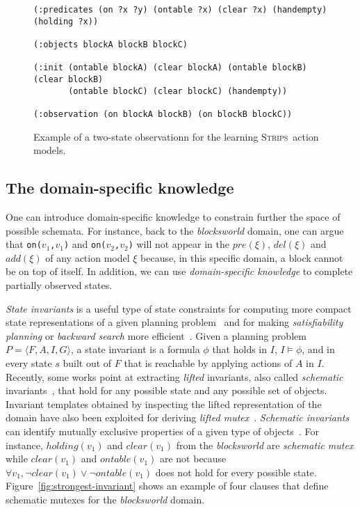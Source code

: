 \documentclass[runningheads]{llncs}
\newcommand{\tup}[1]{{\langle #1 \rangle}}
\newcommand{\strips}{\textsc{Strips}}     %
\begin{document}
\begin{figure}[hbt!]
  \begin{small}
  \begin{verbatim}
(:predicates (on ?x ?y) (ontable ?x) (clear ?x) (handempty) (holding ?x))

(:objects blockA blockB blockC)

(:init (ontable blockA) (clear blockA) (ontable blockB) (clear blockB)
       (ontable blockC) (clear blockC) (handempty))

(:observation (on blockA blockB) (on blockB blockC))
  \end{verbatim}
  \end{small}
	\caption{\small Example of a two-state observationn for the learning \strips\ action models.}
	\label{fig:observation}
\end{figure}


\subsection{The domain-specific knowledge}
One can introduce domain-specific knowledge to constrain further the space of possible schemata. For instance, back to the {\em blocksworld} domain, one can argue that {\small\tt on($v_1$,$v_1$)} and {\small\tt on($v_2$,$v_2$)} will not appear in the $pre(\xi)$, $del(\xi)$ and $add(\xi)$ of any action model $\xi$ because, in this specific domain, a block cannot be on top of itself. In addition, we can use {\em domain-specific knowledge} to complete partially observed states.

{\em State invariants} is a useful type of state constraints for computing more compact state representations of a given planning problem~\cite{helmert2009concise} and for making {\em satisfiability planning} or {\em backward search} more efficient~\cite{rintanen2014madagascar,alcazar2015reminder}. Given a planning problem $P=\tup{F,A,I,G}$, a state invariant is a formula $\phi$ that holds in $I$, $I\models \phi$, and in every state $s$ built out of $F$ that is reachable by applying actions of $A$ in $I$. Recently, some works point at extracting \emph{lifted} invariants, also called {\em schematic} invariants~\cite{rintanen:schematicInvariants:AAAI2017}, that hold for any possible state and any possible set of objects. Invariant templates obtained by inspecting the lifted representation of the domain have also been exploited for deriving \emph{lifted mutex}~\cite{BernardiniFS18}. {\em Schematic invariants} can identify mutually exclusive properties of a given type of objects~\cite{fox:TIM:JAIR1998}. For instance, $holding(v_1)$ and $clear(v_1)$ from the {\em blocksworld} are {\em schematic mutex} while $clear(v_1)$ and $ontable(v_1)$ are not because $\forall v_1, \neg clear(v_1)\vee\neg ontable(v_1)$ does not hold for every possible state. Figure~\ref{fig:strongest-invariant} shows an example of four clauses that define schematic mutexes for the {\em blocksworld} domain.
\end{document}
